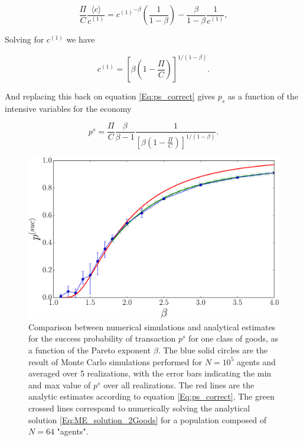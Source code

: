 \begin{equation}
\frac{\Pi}{C} \frac{\langle c \rangle}{c^{(1)}} = {c^{(1)}}^{-\beta} \left( \frac{1}{1-\beta} \right) - \frac{\beta}{1 - \beta } \frac{1}{c^{(1)}},
\end{equation}

Solving for $c^{(1)}$ we have

\begin{equation}
\label{Eq:c1_correct}
c^{(1)} = \left[\beta \left(  1 - \frac{\Pi}{C}\right) \right]^{1/(1 - \beta)}.
\end{equation}

And replacing this back on equation \eqref{Eq:ps_correct} gives $p_s$ as a function of the intensive variables for the economy

\begin{equation}
p^s = \frac{\Pi}{C}\frac{\beta}{\beta - 1} \frac{1}{\left[\beta \left(1 - \frac{\Pi}{C}\right) \right]^{1/(1 - \beta)}}.
\end{equation}

\begin{figure}[!ht]
\includegraphics[width=\textwidth]{figs_ineq/fig_K=1_e=1p2_g=undef_ps_prediction_unadj.pdf}
\caption{Comparison between numerical simulations and analytical estimates for the success probability of transaction $p^s$ for one class of goods, as a function of the Pareto exponent $\beta$. The blue solid circles are the result  of Monte Carlo simulations performed for $N=10^5$ agents and averaged over 5 realizations, with the error bars indicating the min and max value of $p^s$ over all realizations. The red lines are the analytic estimates  according to equation \eqref{Eq:ps_correct}. The green crossed lines correspond to numerically solving the analytical solution  \eqref{Eq:ME_solution_2Goods} for a population composed of $N=64$ "agents".}
\label{Fig:ps_one_good}
\end{figure}

